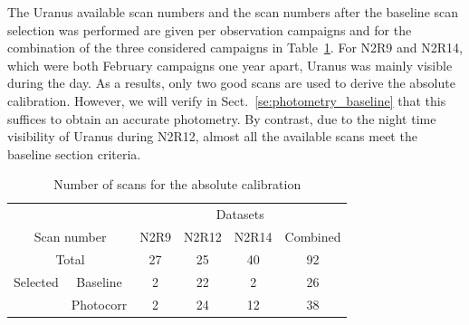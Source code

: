 The Uranus available scan numbers and the scan numbers after the baseline scan
selection was performed are given per observation campaigns and for
the combination of the three considered campaigns in
Table~\ref{tab:absolute_calibration_scan_numbers}. For N2R9 and N2R14,
which were both February campaigns one year apart, Uranus was mainly
visible during the day. As a results, only two good scans are used to
derive the absolute calibration. However, we will verify in
Sect.~\ref{se:photometry_baseline} that this suffices to obtain an
accurate photometry. By contrast, due to the night time visibility of
Uranus during N2R12, almost all the available scans meet the baseline
section criteria. 


\begin{table}[th]
\begin{center}
\begin{tabular}{|c|c|c|c|c|c|}
  \hline
  \multicolumn{2}{|c|}{}            &  \multicolumn{4}{|c|}{Datasets} \\\cline{3-6}
  \multicolumn{2}{|c|}{Scan number} &  N2R9  & N2R12  &  N2R14  &  Combined \\
  \hline\hline
  \multicolumn{2}{|c|}{Total}       &   27   &   25    &   40    &    92  \\
  \hline
  Selected & Baseline               &   2    &   22    &    2    &    26  \\
           & Photocorr              &   2    &   24    &   12    &    38  \\
\hline\hline
\end{tabular}
\caption[Absolute calibration scan numbers]{Number of scans for the absolute calibration}
\label{tab:absolute_calibration_scan_numbers}
\end{center}
\end{table}



